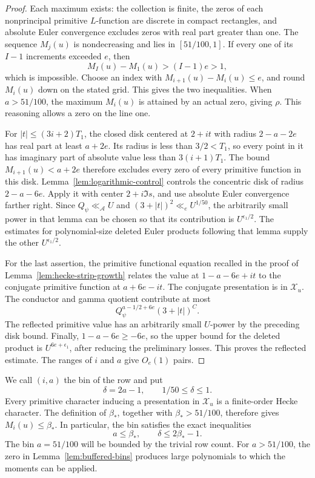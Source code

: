 \documentclass[12pt]{article}
\begin{document}
\begin{proof}
Each maximum exists: the collection is finite, the zeros of each
nonprincipal primitive \(L\)-function are discrete in compact
rectangles, and absolute Euler convergence excludes zeros with real
part greater than one.  The sequence \(M_j(u)\) is nondecreasing
and lies in \([51/100,1]\).  If every one of its \(I-1\) increments
exceeded \(e\), then
\[
 M_I(u)-M_1(u)>(I-1)e>1,
\]
which is impossible.  Choose an index with
\(M_{i+1}(u)-M_i(u)\le e\), and round \(M_i(u)\) down on the stated
grid.  This gives the two inequalities.  When \(a>51/100\), the
maximum \(M_i(u)\) is attained by an actual zero, giving \(\rho\).
This reasoning allows a zero on the line one.

For \(|t|\le(3i+2)T_1\), the closed disk centered at \(2+it\)
with radius \(2-a-2e\) has real part at least \(a+2e\).
Its radius is less than \(3/2<T_1\), so every point in it has
imaginary part of absolute value less than \(3(i+1)T_1\).
The bound \(M_{i+1}(u)<a+2e\) therefore excludes every zero of every
primitive function in this disk.  Lemma~\ref{lem:logarithmic-control}
controls the concentric disk of radius \(2-a-6e\).  Apply it with
center \(2+i\Im s\), and use absolute Euler convergence farther
right.  Since \(Q_\psi\ll_{\mathcal A}U\) and
\((3+|t|)^2\ll_e U^{1/50}\), the arbitrarily small power in that
lemma can be chosen so that its contribution is \(U^{\epsilon_1/2}\).
The estimates for polynomial-size deleted Euler products following
that lemma supply the other \(U^{\epsilon_1/2}\).

For the last assertion, the primitive functional equation recalled
in the proof of Lemma~\ref{lem:hecke-strip-growth}
\cite[Theorem 5.22 and Section 5.11]{Poonen} relates the value at \(1-a-6e+it\) to
the conjugate primitive function at \(a+6e-it\).  The conjugate
presentation is in \(\mathcal X_u\).  The conductor and gamma
quotient contribute at most
\[
 Q_\psi^{a-1/2+6e}(3+|t|)^C.
\]
The reflected primitive value has an arbitrarily small \(U\)-power
by the preceding disk bound.  Finally, \(1-a-6e\ge-6e\), so the
upper bound for the deleted product is \(U^{6e+\epsilon_1}\), after
reducing the preliminary losses.  This proves the reflected
estimate.  The ranges of \(i\) and \(a\) give \(O_e(1)\) pairs.
\end{proof}

We call \((i,a)\) the bin of the row and put
\[
 \delta=2a-1,\qquad 1/50\le\delta\le1.
\]
Every primitive character inducing a presentation in \(\mathcal X_u\)
is a finite-order Hecke character.  The definition of \(\beta_*\),
together with \(\beta_*>51/100\), therefore gives \(M_i(u)\le\beta_*\).
In particular, the bin satisfies the exact inequalities
\[
 a\le\beta_*,\qquad \delta\le2\beta_*-1.
\]
The bin \(a=51/100\) will be bounded by the trivial row count.
For \(a>51/100\), the zero in Lemma~\ref{lem:buffered-bins} produces
large polynomials to which the moments can be applied.
\end{document}
